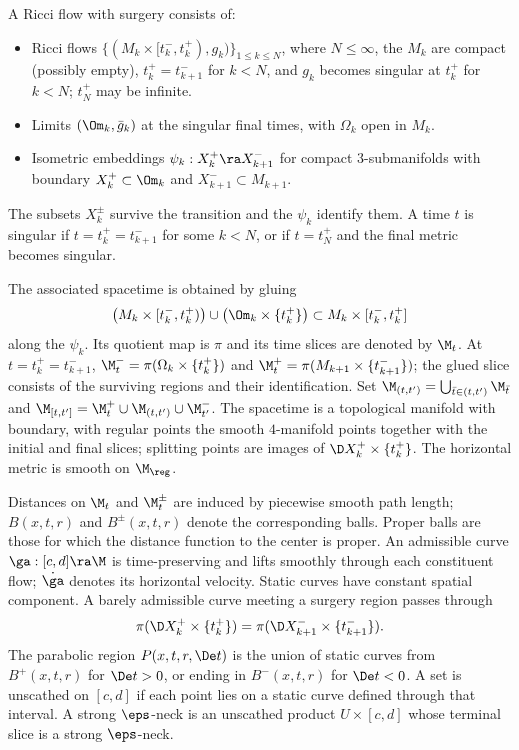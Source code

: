 \begin{definition}
  \label{def:kl-ricci-flow-surgery-general-setting-ricci-flow-surgery-definition}
  \label{flowwithsurgery}
A Ricci flow with surgery consists of:

\begin{itemize}
\item Ricci flows $\{(M_k\times[t_k^-,t_k^+),g_k) \}_{1\leq k\leq N}$,
where $N\leq\infty$, the $M_k$ are compact (possibly empty),
$t_k^+=t_{k+1}^-$ for $k<N$, and $g_k$ becomes singular at $t_k^+$ for
$k<N$; $t_N^+$ may be infinite.
\item Limits $(\Om_k,\bar g_k)$ at the singular final times, with
$\Omega_k$ open in $M_k$.
\item Isometric embeddings
$\psi_k:X_k^+\ra X_{k+1}^-$ for compact $3$-submanifolds with boundary
$X_k^+\subset\Om_k$ and $X_{k+1}^-\subset M_{k+1}$.
\end{itemize}
The subsets $X_k^\pm$ survive the transition and the $\psi_k$ identify
them. A time $t$ is singular if $t=t_k^+=t_{k+1}^-$ for some $k<N$, or
if $t=t_N^+$ and the final metric becomes singular.
\end{definition}

The associated spacetime is obtained by gluing
\begin{equation}
\left(M_k\times [t_k^-,t_k^+)\right)\cup
\left(\Om_k\times\{t_k^+\}\right)
\subset M_k\times[t_k^-,t_k^+]
\end{equation}
along the $\psi_k$. Its quotient map is $\pi$ and its time slices are
denoted by $\M_t$. At $t=t_k^+=t_{k+1}^-$,
$\M_t^- = \pi(\Omega_k\times\{t_k^+\})$ and
$\M_t^+ = \pi(M_{k+1}\times\{t_{k+1}^-\})$; the glued slice consists of
the surviving regions and their identification. Set
$\M_{(t,t')}=\bigcup_{\bar t\in(t,t')}\M_{\bar t}$ and
$\M_{[t,t']}=\M_t^+\cup\M_{(t,t')}\cup\M_{t'}^-$. The spacetime is a
topological manifold with boundary, with regular points the smooth
$4$-manifold points together with the initial and final slices; splitting
points are images of $\D X_k^+\times\{t_k^+\}$. The horizontal metric is
smooth on $\M_{\reg}$.

Distances on $\M_t$ and $\M_t^\pm$ are induced by piecewise smooth path
length; $B(x,t,r)$ and $B^\pm(x,t,r)$ denote the corresponding balls.
Proper balls are those for which the distance function to the center is
proper. An admissible curve $\ga:[c,d]\ra\M$ is time-preserving and lifts
smoothly through each constituent flow; $\dot\ga$ denotes its horizontal
velocity. Static curves have constant spatial component. A barely admissible
curve meeting a surgery region passes through
\begin{equation}
\pi(\D X_k^+\times\{t_k^+\})
=\pi(\D X_{k+1}^-\times\{t_{k+1}^-\}).
\end{equation}
The parabolic region $P(x,t,r,\De t)$ is the union of static curves from
$B^+(x,t,r)$ for $\De t>0$, or ending in $B^-(x,t,r)$ for $\De t<0$.
A set is unscathed on $[c,d]$ if each point lies on a static curve defined
through that interval. A strong $\eps$-neck is an unscathed product
$U\times[c,d]$ whose terminal slice is a strong $\eps$-neck.

